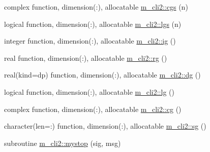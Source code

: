 \begin{DoxyCompactItemize}
\item 
complex function, dimension(\+:), allocatable \mbox{\hyperlink{namespacem__cli2_a05456ce2d696e1632be5efe8e7c2afe3}{m\+\_\+cli2\+::cgs}} (n)
\item 
logical function, dimension(\+:), allocatable \mbox{\hyperlink{namespacem__cli2_a4cda9acefdf56b45483ea41b73494c8d}{m\+\_\+cli2\+::lgs}} (n)
\item 
integer function, dimension(\+:), allocatable \mbox{\hyperlink{namespacem__cli2_a11c3cc864e613c90b2a02c7409c00828}{m\+\_\+cli2\+::ig}} ()
\item 
real function, dimension(\+:), allocatable \mbox{\hyperlink{namespacem__cli2_aff7a379ff1e7269001592f452ab017c8}{m\+\_\+cli2\+::rg}} ()
\item 
real(kind=dp) function, dimension(\+:), allocatable \mbox{\hyperlink{namespacem__cli2_a06ddc2533e5122b8f898bae7db0fea87}{m\+\_\+cli2\+::dg}} ()
\item 
logical function, dimension(\+:), allocatable \mbox{\hyperlink{namespacem__cli2_aa1653cf1d6ce9739c1dcfdcb5361fa5f}{m\+\_\+cli2\+::lg}} ()
\item 
complex function, dimension(\+:), allocatable \mbox{\hyperlink{namespacem__cli2_af45e2401f7c3c2309fe92882c1d5e521}{m\+\_\+cli2\+::cg}} ()
\item 
character(len=\+:) function, dimension(\+:), allocatable \mbox{\hyperlink{namespacem__cli2_abc94b8f97a6056ea48ce48ab460bdf78}{m\+\_\+cli2\+::sg}} ()
\item 
subroutine \mbox{\hyperlink{namespacem__cli2_a0e44d7c9058545df8bf09674e9c2e799}{m\+\_\+cli2\+::mystop}} (sig, msg)
\end{DoxyCompactItemize}
